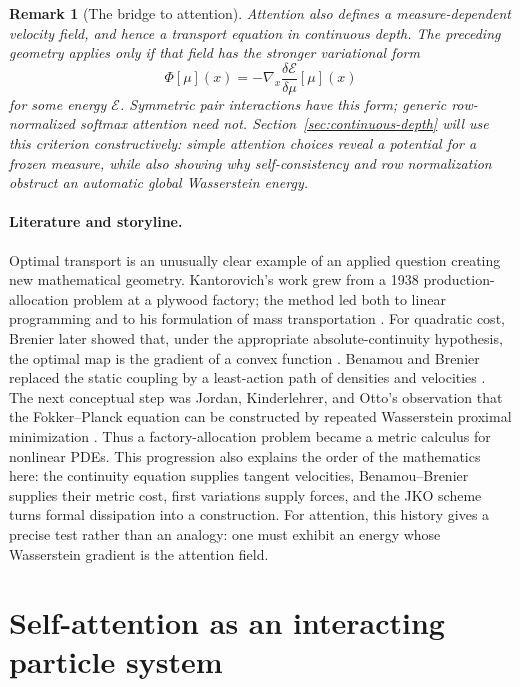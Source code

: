 \documentclass[11pt]{amsart}
\numberwithin{equation}{section}
\theoremstyle{plain}
\newtheorem{remark}[theorem]{Remark}
\begin{document}
\begin{remark}[The bridge to attention]
Attention also defines a measure-dependent velocity field, and hence a
transport equation in continuous depth.  The preceding geometry applies
only if that field has the stronger variational form
\[
 \Phi[\mu](x)=-\nabla_x
 \frac{\delta\mathcal E}{\delta\mu}[\mu](x)
\]
for some energy $\mathcal E$.  Symmetric pair interactions have this form;
generic row-normalized softmax attention need not.
Section~\ref{sec:continuous-depth} will use this
criterion constructively: simple attention choices reveal a potential for a
frozen measure, while also showing why self-consistency and row normalization
obstruct an automatic global Wasserstein energy.
\end{remark}

\paragraph{\textbf{Literature and storyline.}}
Optimal transport is an unusually clear example of an applied question
creating new mathematical geometry.  Kantorovich's work grew from a 1938
production-allocation problem at a plywood factory; the method led both to
linear programming and to his formulation of mass transportation
\cite{KantorovichMacTutor,Kantorovich1942,NobelKantorovich1975}.  For quadratic
cost, Brenier later
showed that, under the appropriate absolute-continuity hypothesis, the optimal
map is the gradient of a convex function \cite{Brenier1991}.  Benamou and
Brenier replaced the static coupling by a least-action path of densities and
velocities \cite{BenamouBrenier2000}.  The next conceptual step was Jordan,
Kinderlehrer, and Otto's observation that the Fokker--Planck equation can be
constructed by repeated Wasserstein proximal minimization
\cite{JordanKinderlehrerOtto1998}.  Thus a factory-allocation problem became a
metric calculus for nonlinear PDEs.  This progression also explains the
order of the mathematics here: the continuity equation supplies tangent
velocities, Benamou--Brenier supplies their metric cost, first variations
supply forces, and the JKO scheme turns formal dissipation into a construction.
For attention, this history gives a precise test rather than an analogy: one
must exhibit an energy whose Wasserstein gradient is the attention field.


\section{Self-attention as an interacting particle system}
\label{sec:self-attention}
\end{document}

